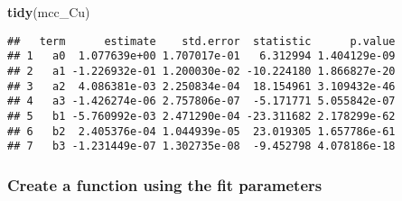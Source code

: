 \documentclass[]{book}
\newenvironment{Shaded}{\begin{snugshade}}{\end{snugshade}}
\newcommand{\ControlFlowTok}[1]{\textcolor[rgb]{0.13,0.29,0.53}{\textbf{#1}}}
\newcommand{\DecValTok}[1]{\textcolor[rgb]{0.00,0.00,0.81}{#1}}
\newcommand{\KeywordTok}[1]{\textcolor[rgb]{0.13,0.29,0.53}{\textbf{#1}}}
\newcommand{\NormalTok}[1]{#1}
\newcommand{\OperatorTok}[1]{\textcolor[rgb]{0.81,0.36,0.00}{\textbf{#1}}}
\newcommand{\StringTok}[1]{\textcolor[rgb]{0.31,0.60,0.02}{#1}}
\theoremstyle{definition}
\theoremstyle{definition}
\theoremstyle{definition}
\theoremstyle{remark}
\begin{document}
\begin{Shaded}
\begin{Highlighting}[]
\KeywordTok{tidy}\NormalTok{(mcc_Cu)}
\end{Highlighting}
\end{Shaded}

\begin{verbatim}
##   term      estimate    std.error  statistic      p.value
## 1   a0  1.077639e+00 1.707017e-01   6.312994 1.404129e-09
## 2   a1 -1.226932e-01 1.200030e-02 -10.224180 1.866827e-20
## 3   a2  4.086381e-03 2.250834e-04  18.154961 3.109432e-46
## 4   a3 -1.426274e-06 2.757806e-07  -5.171771 5.055842e-07
## 5   b1 -5.760992e-03 2.471290e-04 -23.311682 2.178299e-62
## 6   b2  2.405376e-04 1.044939e-05  23.019305 1.657786e-61
## 7   b3 -1.231449e-07 1.302735e-08  -9.452798 4.078186e-18
\end{verbatim}

\hypertarget{create-a-function-using-the-fit-parameters}{%
\subsubsection{Create a function using the fit
parameters}\label{create-a-function-using-the-fit-parameters}}

\begin{Shaded}
\end{Shaded}
\end{document}
